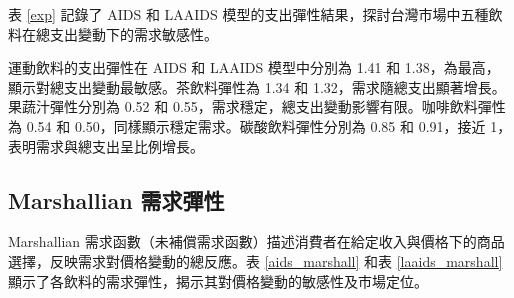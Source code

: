 
表 \ref{exp} 記錄了 AIDS 和 LAAIDS 模型的支出彈性結果，探討台灣市場中五種飲料在總支出變動下的需求敏感性。

運動飲料的支出彈性在 AIDS 和 LAAIDS 模型中分別為 1.41 和 1.38，為最高，顯示對總支出變動最敏感。茶飲料彈性為 1.34 和 1.32，需求隨總支出顯著增長。果蔬汁彈性分別為 0.52 和 0.55，需求穩定，總支出變動影響有限。咖啡飲料彈性為 0.54 和 0.50，同樣顯示穩定需求。碳酸飲料彈性分別為 0.85 和 0.91，接近 1，表明需求與總支出呈比例增長。

\subsection{Marshallian 需求彈性}




Marshallian 需求函數（未補償需求函數）描述消費者在給定收入與價格下的商品選擇，反映需求對價格變動的總反應。表 \ref{aids_marshall} 和表 \ref{laaids_marshall} 顯示了各飲料的需求彈性，揭示其對價格變動的敏感性及市場定位。

